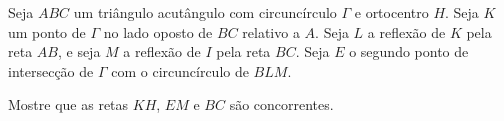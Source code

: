 Seja $ABC$ um triângulo acutângulo com circuncírculo $\Gamma$ e ortocentro $H$. Seja $K$ um ponto de $\Gamma$ no lado oposto de $BC$ relativo a $A$. Seja $L$ a reflexão de $K$ pela reta $AB$, e seja $M$ a reflexão de  $I$ pela reta $BC$. Seja $E$ o segundo ponto de intersecção de $\Gamma$ com o circuncírculo de $BLM$.

Mostre que as retas $KH$, $EM$ e $BC$ são concorrentes.
